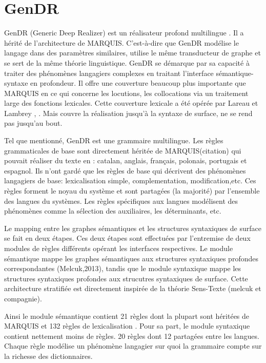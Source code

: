 
\chapter{GenDR}\label{chapgendr}

GenDR (Generic Deep Realizer) est un réalisateur profond multilingue \citep{lareau18}. Il a hérité de l'architecture de MARQUIS. C'est-à-dire que GenDR modélise le langage dans des paramètres similaires, utilise le même transducteur de graphe et se sert de la même théorie linguistique. GenDR se démarque par sa capacité à traiter des phénomènes langagiers complexes en traitant l'interface sémantique-syntaxe en profondeur. Il offre une couverture beaucoup plus importante que MARQUIS en ce qui concerne les locutions, les collocations via un traitement large des fonctions lexicales. Cette couverture lexicale a été opérée par Lareau et Lambrey \cite{LambreyImplementationcollocationspour2017}, \cite{lambrey15}. Mais couvre la réalisation jusqu'à la syntaxe de surface, ne se rend pas jusqu'au bout.

Tel que mentionné, GenDR est une grammaire multilingue. Les règles grammaticales de base sont directement héritée de MARQUIS(citation) qui pouvait réaliser du texte en : catalan, anglais, français, polonais, portugais et espagnol. Ils n'ont gardé que les règles de base qui décrivent des phénomènes langagiers de base: lexicalisation simple, complementation, modification,etc. Ces règles forment le noyau du système et sont partagées (la majorité) par l'ensemble des langues du systèmes. Les règles spécifiques aux langues modélisent des phénomènes comme la sélection des auxiliaires, les déterminants, etc.

Le mapping entre les graphes sémantiques et les structures syntaxiques de surface se fait en deux étapes. Ces deux étapes sont effectuées par l'entremise de deux modules de règles différents opérant les interfaces respectives. Le module sémantique mappe les graphes sémantiques aux structures syntaxiques profondes correspondantes (Melcuk,2013), tandis que le module syntaxique mappe les structures syntaxiques profondes aux strucutres syntaxiques de surface. Cette architecture stratifiée est directement inspirée de la théorie Sens-Texte (melcuk et compagnie).

Ainsi le module sémantique contient 21 règles dont la plupart sont héritées de MARQUIS et 132 règles de lexicalisation \citep{LambreyImplementationcollocationspour2017}. Pour sa part, le module syntaxique contient nettement moins de règles. 20 règles dont 12 partagées entre les langues. Chaque règle modélise un phénomène langagier sur quoi la grammaire compte sur la richesse des dictionnaires.

